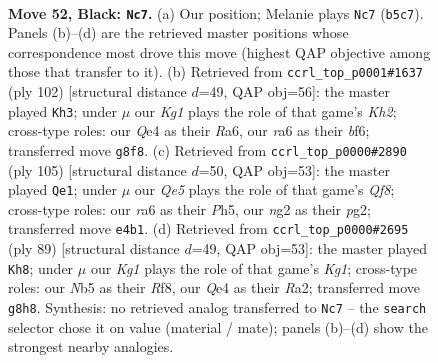 \documentclass[11pt]{article}
\begin{document}
\clearpage

\begin{figure}[p]\centering
\begin{subfigure}{0.46\textwidth}\centering
\resizebox{\linewidth}{!}{%
\newchessgame
\chessboard[
  setfen={6k1/1r3pb1/R7/1n1P2R1/4q3/8/5KN1/8 b - - 1 52},
  showmover=false,
  pgfstyle=straightmove, color=movearrow, markmove={b5-c7}
]}
\caption{}
\end{subfigure}\hfill
\begin{subfigure}{0.46\textwidth}\centering
\resizebox{\linewidth}{!}{%
\newchessgame
\chessboard[
  setfen={8/7k/R3nb2/5N1p/8/6P1/4r1BK/8 w - - 8 52},
  showmover=false,
  pgfstyle=straightmove, color=movearrow, markmove={h2-h3}
]}
\caption{}
\end{subfigure}
\\[4pt]
\begin{subfigure}{0.46\textwidth}\centering
\resizebox{\linewidth}{!}{%
\newchessgame
\chessboard[
  setfen={8/8/6pk/7p/8/8/2R2PPK/R1n2q2 b - - 1 53},
  showmover=false,
  pgfstyle=straightmove, color=movearrow, markmove={f1-e1}
]}
\caption{}
\end{subfigure}\hfill
\begin{subfigure}{0.46\textwidth}\centering
\resizebox{\linewidth}{!}{%
\newchessgame
\chessboard[
  setfen={5rk1/6bp/4R3/6RP/8/8/r3NP2/5K2 b - - 2 45},
  showmover=false,
  pgfstyle=straightmove, color=movearrow, markmove={g8-h8}
]}
\caption{}
\end{subfigure}
\caption{\textbf{Move 52, Black: \texttt{Nc7}.} (a) Our position; Melanie plays \texttt{Nc7} (\texttt{b5c7}). Panels (b)--(d) are the retrieved master positions whose correspondence most drove this move (highest QAP objective among those that transfer to it). (b) Retrieved from \texttt{ccrl\_top\_p0001\#1637} (ply 102) [structural distance $d$=49, QAP obj=56]: the master played \texttt{Kh3}; under $\mu$ our \emph{Kg1} plays the role of that game's \emph{Kh2}; cross-type roles: our \emph{Q}e4 as their \emph{R}a6, our \emph{r}a6 as their \emph{b}f6; transferred move \texttt{g8f8}. (c) Retrieved from \texttt{ccrl\_top\_p0000\#2890} (ply 105) [structural distance $d$=50, QAP obj=53]: the master played \texttt{Qe1}; under $\mu$ our \emph{Qe5} plays the role of that game's \emph{Qf8}; cross-type roles: our \emph{r}a6 as their \emph{P}h5, our \emph{n}g2 as their \emph{p}g2; transferred move \texttt{e4b1}. (d) Retrieved from \texttt{ccrl\_top\_p0000\#2695} (ply 89) [structural distance $d$=49, QAP obj=53]: the master played \texttt{Kh8}; under $\mu$ our \emph{Kg1} plays the role of that game's \emph{Kg1}; cross-type roles: our \emph{N}b5 as their \emph{R}f8, our \emph{Q}e4 as their \emph{R}a2; transferred move \texttt{g8h8}. Synthesis: no retrieved analog transferred to \texttt{Nc7} -- the \texttt{search} selector chose it on value (material / mate); panels (b)--(d) show the strongest nearby analogies.}
\label{fig:thought-m103}
\end{figure}
\end{document}
